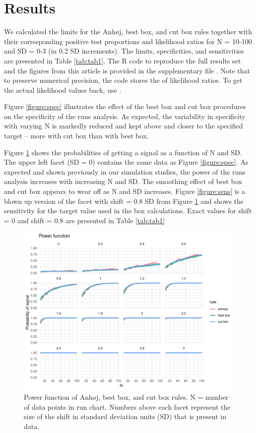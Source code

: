 \hypertarget{results}{%
\section{Results}\label{results}}

We calculated the limits for the Anhøj, best box, and cut box rules
together with their corresponding positive test proportions and
likelihood ratios for N = 10-100 and SD = 0-3 (in 0.2 SD increments).
The limits, specificities, and sensitivities are presented in Table
\ref{tab:tab1}. The R code to reproduce the full results set and the
figures from this article is provided in the supplementary file
. Note that to preserve numerical precision, the
code stores the  of likelihood ratios. To get the actual
likelihood values back, use .

Figure \ref{figure:spec} illustrates the effect of the best box and cut
box procedures on the specificity of the runs analysis. As expected, the
variability in specificity with varying N is markedly reduced and kept
above and closer to the specified target -- more with cut box than with
best box.

Figure \ref{figure:pwr} shows the probabilities of getting a signal as a
function of N and SD. The upper left facet (SD = 0) contains the same
data as Figure \ref{figure:spec}. As expected and shown previously in
our simulation studies, the power of the runs analysis increases with
increasing N and SD. The smoothing effect of best box and cut box
appears to wear off as N and SD increases. Figure \ref{figure:sens} is a
blown up version of the facet with shift = 0.8 SD from Figure
\ref{figure:pwr} and shows the sensitivity for the target value used in
the box calculations. Exact values for shift = 0 and shift = 0.8 are
presented in Table \ref{tab:tab1}

\begin{figure}[htbp]
  \centering
  \includegraphics[width=\textwidth]{fig_pwr.pdf}
  \caption{Power function of Anhøj, best box, and cut box rules.
           N = number of data points in run chart.
           Numbers above each facet represent the size of the shift in standard
           deviation units (SD) that is present in data.}
  \label{figure:pwr}
\end{figure}

